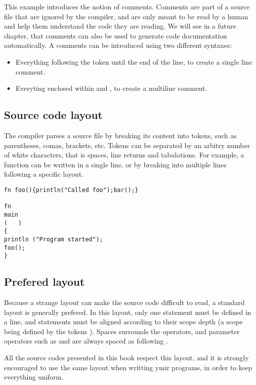 This example introduces the notion of comments. Comments are part of a source
file that are ignored by the compiler, and are only meant to be read by a human
and help them understand the code they are reading. We will see in a future
chapter, that comments can also be used to generate code documentation
automatically. A comments can be introduced using two different syntaxes:
\begin{itemize}
\item Everything following the token \token{//} until the end of the line, to
  create a single line comment.
\item Everyting enclosed within \token{/*} and \token{*/}, to create a multiline comment.
\end{itemize}

\subsection{Source code layout}

The compiler parses a source file by breaking its content into tokens, such as
parentheses, comas, brackets, etc. Tokens can be separated by an arbitry number
of white characters, that is spaces, line returns and tabulations. For example,
a function can be written in a single line, or by breaking into multiple lines
following a specific layout.


\begin{lstlisting}[style=coloredverbatim, caption=Arbitrary code layout example]
fn foo(){println("Called foo");bar();}

fn
main
(   )
{
println ("Program started");
foo();
}
\end{lstlisting}

\subsection{Prefered layout}

Because a strange layout can make the source code difficult to read, a standard
layout is generally prefered. In this layout, only one statement must be defined
in a line, and statements must be aligned according to their scope depth (a
scope being defined by the tokens \token{\{\}}). Spaces surrounds the operators,
and parameter operators such as \token{()} and \token{[]} are always spaced as
following .

All the source codes presented in this book respect this layout, and it is
strongly encouraged to use the same layout when writting ymir programs, in order
to keep everything uniform.


